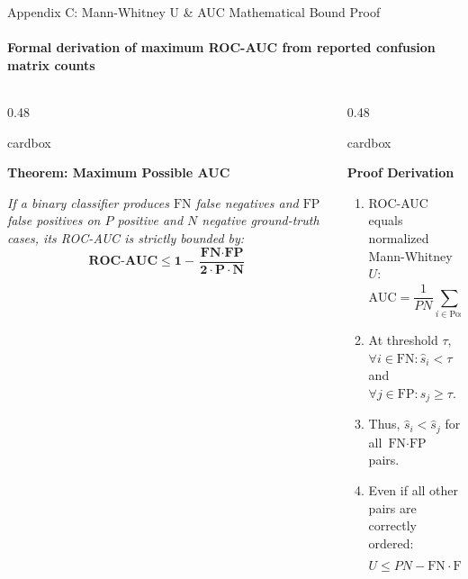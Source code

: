 \documentclass[aspectratio=169, 10pt]{beamer}
\newcommand{\cardbox}[3]{%
  \begin{beamercolorbox}[wd=\linewidth,rounded=true,sep=2.5pt]{cardbox}%
    {\bfseries\scriptsize\color{#1}#2\par}\vspace*{1pt}%
    {\footnotesize #3}%
  \end{beamercolorbox}%
}
\begin{document}
\begin{frame}{Appendix C: Mann-Whitney U \& AUC Mathematical Bound Proof}
  \framesubtitle{Formal derivation of maximum ROC-AUC from reported confusion matrix counts}

  \begin{columns}[T]
    \begin{column}{0.48\textwidth}
      \cardbox{DeepPurple}{Theorem: Maximum Possible AUC}{
        \textit{If a binary classifier produces $\text{FN}$ false negatives and $\text{FP}$ false positives on $P$ positive and $N$ negative ground-truth cases, its ROC-AUC is strictly bounded by:}
        \[
          \mathbf{\text{ROC-AUC} \le 1 - \frac{\text{FN} \cdot \text{FP}}{2 \cdot P \cdot N}}
        \]
      }
    \end{column}

    \begin{column}{0.48\textwidth}
      \cardbox{CardBg}{Proof Derivation}{
        \begin{enumerate}\setlength\itemsep{1pt}\scriptsize
          \item ROC-AUC equals normalized Mann-Whitney $U$:
          \[
            \text{AUC} = \frac{1}{PN} \sum_{i \in \text{Pos}} \sum_{j \in \text{Neg}} \left( \mathbf{1}_{[\hat{s}_i > \hat{s}_j]} + \frac{1}{2}\mathbf{1}_{[\hat{s}_i = \hat{s}_j]} \right)
          \]
          \item At threshold $\tau$, $\forall i \in \text{FN}: \hat{s}_i < \tau$ and $\forall j \in \text{FP}: \hat{s}_j \ge \tau$.
          \item Thus, $\hat{s}_i < \hat{s}_j$ for all $\text{FN} \cdot \text{FP}$ pairs.
          \item Even if all other pairs are correctly ordered:
          \[
            U \le PN - \text{FN}\cdot\text{FP} \implies \text{AUC} \le 1 - \frac{\text{FN}\cdot\text{FP}}{2PN}. \quad \blacksquare
          \]
        \end{enumerate}
      }
    \end{column}
  \end{columns}
\end{frame}
\end{document}
